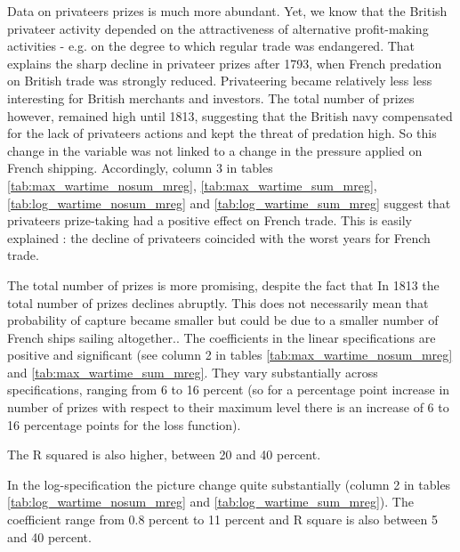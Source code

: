 \documentclass[12pt,a4paper,notitlepage,english]{article}
\begin{document}
Data on privateers prizes is much more abundant.
Yet, we know that the British privateer activity depended on the attractiveness of alternative profit-making activities \citep[p. 673]{Villiers2002,Hillmann2011} - e.g. on the degree to which regular trade was endangered. That explains the sharp decline in privateer prizes after 1793, when French predation on British trade was strongly reduced.
Privateering became relatively less less interesting for British merchants and investors.
The total number of prizes however, remained high until 1813, suggesting that the British navy compensated for the lack of privateers actions and kept the threat of predation high.
So this change in the variable was not linked to a change in the pressure applied on French shipping.
Accordingly, column 3 in tables  \ref{tab:max_wartime_nosum_mreg},  \ref{tab:max_wartime_sum_mreg}, \ref{tab:log_wartime_nosum_mreg} and   \ref{tab:log_wartime_sum_mreg}  suggest that privateers prize-taking had a positive effect on French trade.
This is easily explained : the decline of privateers coincided with the worst years for French trade.




The total number of prizes is more promising, despite the fact that In 1813 the total number of prizes declines abruptly.
This does not necessarily mean that probability of capture became smaller but could be due to a smaller number of French ships sailing altogether..
The coefficients in the linear specifications are positive and significant (see column 2 in tables  \ref{tab:max_wartime_nosum_mreg} and  \ref{tab:max_wartime_sum_mreg}.
They vary substantially across specifications, ranging from 6 to 16 percent (so for a percentage point increase in number of prizes with respect to their maximum level there is an increase of 6 to 16 percentage points for the loss function).

The R squared is also higher, between 20 and 40 percent.

In the log-specification the picture change quite substantially (column 2 in tables \ref{tab:log_wartime_nosum_mreg} and \ref{tab:log_wartime_sum_mreg}).
The coefficient range from 0.8 percent to 11 percent and R square is also between 5 and 40 percent.
\end{document}
